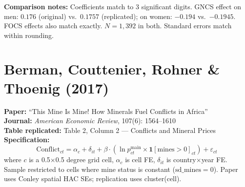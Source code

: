 \documentclass[11pt,a4paper]{article}
\begin{document}
\vspace{1cm}
\textbf{Comparison notes:} Coefficients match to 3 significant digits. GNCS effect on men: $0.176$ (original) vs.\ $0.1757$ (replicated); on women: $-0.194$ vs.\ $-0.1945$. FOCS effects also match exactly. $N = 1{,}392$ in both. Standard errors match within rounding.

\newpage

\section{Berman, Couttenier, Rohner \& Thoenig (2017)}

\textbf{Paper:} ``This Mine Is Mine! How Minerals Fuel Conflicts in Africa''\\
\textbf{Journal:} \textit{American Economic Review}, 107(6): 1564--1610\\
\textbf{Table replicated:} Table 2, Column 2 --- Conflicts and Mineral Prices\\
\textbf{Specification:}
\[
\text{Conflict}_{ct} = \alpha_c + \delta_{it} + \beta \cdot (\ln p^{\text{main}}_{ct} \times \mathbf{1}[\text{mines}>0]_{ct}) + \varepsilon_{ct}
\]
where $c$ is a 0.5$\times$0.5 degree grid cell, $\alpha_c$ is cell FE, $\delta_{it}$ is country$\times$year FE. Sample restricted to cells where mine status is constant ($\text{sd\_mines}=0$). Paper uses Conley spatial HAC SEs; replication uses cluster(cell).

\vspace{0.3cm}
\noindent{}
\end{document}
